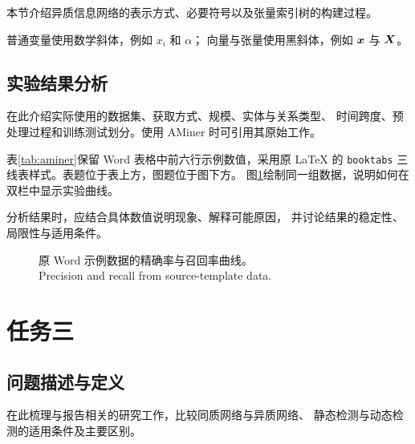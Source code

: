 \documentclass[sigconf,nonacm,screen]{acmart}
\begin{document}
本节介绍异质信息网络的表示方式、必要符号以及张量索引树的构建过程。

普通变量使用数学斜体，例如 $x_i$ 和 $\alpha$；
向量与张量使用黑斜体，例如 $\bm{x}$ 与 $\bm{X}$。

\subsection{实验结果分析}
\label{sec:task2-result}
在此介绍实际使用的数据集、获取方式、规模、实体与关系类型、
时间跨度、预处理过程和训练测试划分。使用 AMiner 时可引用其原始工作\cite{tang2008}。

表\ref{tab:aminer}保留 Word 表格中前六行示例数值，采用原 LaTeX
的 \texttt{booktabs} 三线表样式。表题位于表上方，图题位于图下方。
图\ref{fig:performance}绘制同一组数据，说明如何在双栏中显示实验曲线。

分析结果时，应结合具体数值说明现象、解释可能原因，
并讨论结果的稳定性、局限性与适用条件。

\begin{figure}[tbp]
  \centering
  \caption{原 Word 示例数据的精确率与召回率曲线。\\Precision and recall from source-template data.}
  \label{fig:performance}
\end{figure}

\section{任务三}
\label{sec:task3}
\subsection{问题描述与定义}
\label{sec:task3-problem}
在此梳理与报告相关的研究工作，比较同质网络与异质网络、
静态检测与动态检测的适用条件及主要区别。
\end{document}
